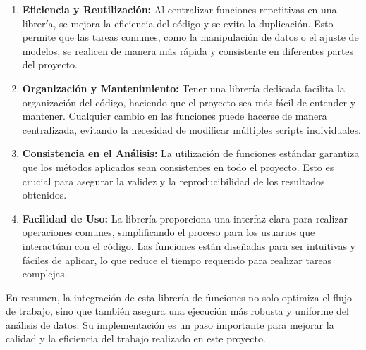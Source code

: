 \documentclass[11pt]{article}
\begin{document}
\begin{enumerate}
\def\labelenumi{\arabic{enumi}.}
\item
  \textbf{Eficiencia y Reutilización:} Al centralizar funciones
  repetitivas en una librería, se mejora la eficiencia del código y se
  evita la duplicación. Esto permite que las tareas comunes, como la
  manipulación de datos o el ajuste de modelos, se realicen de manera
  más rápida y consistente en diferentes partes del proyecto.
\item
  \textbf{Organización y Mantenimiento:} Tener una librería dedicada
  facilita la organización del código, haciendo que el proyecto sea más
  fácil de entender y mantener. Cualquier cambio en las funciones puede
  hacerse de manera centralizada, evitando la necesidad de modificar
  múltiples scripts individuales.
\item
  \textbf{Consistencia en el Análisis:} La utilización de funciones
  estándar garantiza que los métodos aplicados sean consistentes en todo
  el proyecto. Esto es crucial para asegurar la validez y la
  reproducibilidad de los resultados obtenidos.
\item
  \textbf{Facilidad de Uso:} La librería proporciona una interfaz clara
  para realizar operaciones comunes, simplificando el proceso para los
  usuarios que interactúan con el código. Las funciones están diseñadas
  para ser intuitivas y fáciles de aplicar, lo que reduce el tiempo
  requerido para realizar tareas complejas.
\end{enumerate}

En resumen, la integración de esta librería de funciones no solo
optimiza el flujo de trabajo, sino que también asegura una ejecución más
robusta y uniforme del análisis de datos. Su implementación es un paso
importante para mejorar la calidad y la eficiencia del trabajo realizado
en este proyecto.
\end{document}
